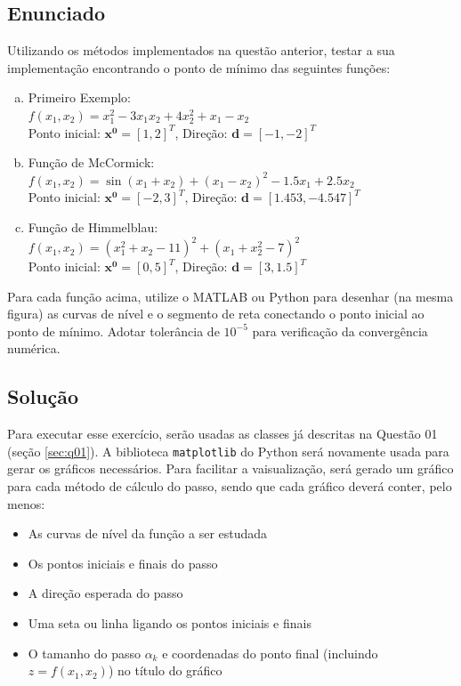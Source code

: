 \documentclass[10pt, a4paper]{article}
\begin{document}
\subsection{Enunciado}

Utilizando os métodos implementados na questão anterior, testar a sua
implementação encontrando o ponto de mínimo das seguintes funções:

\begin{enumerate}[(a)]
  \item Primeiro Exemplo: \\
        $f(x_1, x_2) = x_1^2 - 3x_1x_2 + 4x_2^2 + x_1 - x_2$ \\
        Ponto inicial: $\mathbf{x^0} = [1, 2]^T$, Direção: $\mathbf{d} = [-1, -2]^T$\label{func:a}
  \item Função de McCormick: \\
        $f(x_1, x_2) = \sin{(x_1 + x_2)} + (x_1 - x_2)^2 - 1.5x_1 + 2.5x_2$ \\
        Ponto inicial: $\mathbf{x^0} = [-2, 3]^T$, Direção: $\mathbf{d} = [1.453, -4.547]^T$\label{func:b}
  \item Função de Himmelblau: \\
        $f(x_1, x_2) = (x_1^2 + x_2 - 11)^2 + (x_1 + x_2^2 - 7)^2$ \\
        Ponto inicial: $\mathbf{x^0} = [0, 5]^T$, Direção: $\mathbf{d} = [3, 1.5]^T$\label{func:c}
\end{enumerate}

Para cada função acima, utilize o MATLAB ou Python para desenhar (na mesma figura) as
curvas de nível e o segmento de reta conectando o ponto inicial ao ponto de mínimo.
Adotar tolerância de $10^{-5}$ para verificação da convergência numérica.

\subsection{Solução}

Para executar esse exercício, serão usadas as classes já descritas na Questão 01 (seção \ref{sec:q01}). A biblioteca {\tt matplotlib} do Python será 
novamente usada para gerar os gráficos necessários. Para facilitar a vaisualização, será gerado um gráfico para cada método de cálculo do passo, sendo que 
cada gráfico deverá conter, pelo menos:

\begin{itemize}
  \item As curvas de nível da função a ser estudada
  \item Os pontos iniciais e finais do passo
  \item A direção esperada do passo
  \item Uma seta ou linha ligando os pontos iniciais e finais
  \item O tamanho do passo $\alpha_k$ e coordenadas do ponto final (incluindo $z = f(x_1, x_2)$) no título do gráfico
\end{itemize}
\end{document}
